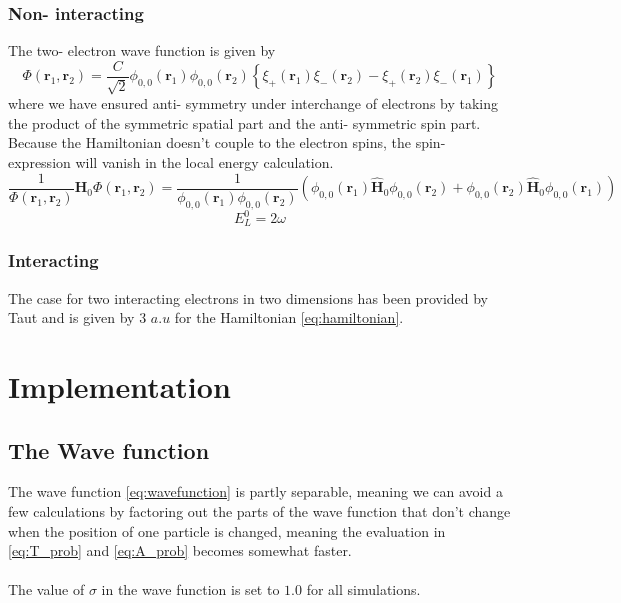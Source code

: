 \documentclass[11pt,a4paper,titlepage]{article}
\begin{document}
\subsubsection{Non- interacting}
The two- electron wave function is given by
\begin{equation}
\Phi\left(\boldsymbol{r}_{1}, \boldsymbol{r}_{2}\right)=\frac{C}{\sqrt{2}} \phi_{0, 0}(\boldsymbol{r}_{1})\phi_{0, 0}(\boldsymbol{r}_{2})\left\{ \xi_+(\boldsymbol{r}_{1})\xi_-(\boldsymbol{r}_{2})-\xi_+(\boldsymbol{r}_{2})\xi_-(\boldsymbol{r}_{1})\right\}
\end{equation}
where we have ensured anti- symmetry under interchange of electrons by taking the product of the symmetric spatial part and the anti- symmetric spin part. Because the Hamiltonian doesn't couple to the electron spins, the spin- expression will vanish in the local energy calculation. 
\begin{equation}
\frac{1}{\Phi\left(\boldsymbol{r}_{1}, \boldsymbol{r}_{2}\right)} \hat{\mathbf{H}}_0 \Phi\left(\boldsymbol{r}_{1}, \boldsymbol{r}_{2}\right) =\frac{1}{\phi_{0, 0}(\boldsymbol{r}_{1})\phi_{0, 0}(\boldsymbol{r}_{2}) } \left( \phi_{0, 0}(\boldsymbol{r}_{1})\hat{\mathbf{H}}_0\phi_{0, 0}(\boldsymbol{r}_{2}) + \phi_{0, 0}(\boldsymbol{r}_{2})\hat{\mathbf{H}}_0\phi_{0, 0}(\boldsymbol{r}_{1}) \right)
\end{equation}
\begin{equation}
E^0_L = 2\omega
\end{equation}

\subsubsection{Interacting}
The case for two interacting electrons in two dimensions has been provided by Taut \cite{PhysRevA.48.3561} and is given by 3 $a.u$ for the Hamiltonian \eqref{eq:hamiltonian}.
\section{Implementation}
\subsection{The Wave function}
The wave function \eqref{eq:wavefunction} is partly separable, meaning we can avoid a few calculations by factoring out the parts of the wave function that don't change when the position of one particle is changed, meaning the evaluation in \eqref{eq:T_prob} and \eqref{eq:A_prob} becomes somewhat faster.\\\\The value of $\sigma$ in the wave function is set to $1.0$ for all simulations.
\end{document}
